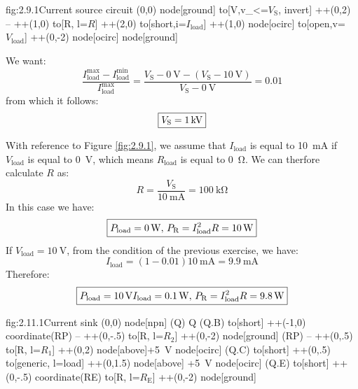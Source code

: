 \begin{circuit}{fig:2.9.1}{Current source circuit}
    (0,0) node[ground] {}
    to[V,v_<=$V_\text{S}$, invert] ++(0,2)
    -- ++(1,0)
    to[R, l=$R$] ++(2,0)
    to[short,i=$I_\text{load}$] ++(1,0)
    node[ocirc] {}
    to[open,v=$V_\text{load}$] ++(0,-2)
    node[ocirc] {}
    node[ground] {}
\end{circuit}
We want:
\[\frac{I_\text{load}^\text{max}-I_\text{load}^\text{min}}{I_\text{load}^\text{max}}=\frac{V_\text{S}-\SI{0}{\volt}-(V_\text{S}-\SI{10}{\volt})}{V_\text{S}-\SI{0}{\volt}}=0.01\]
from which it follows:
\[\boxed{V_\text{S}=\SI{1}{\kilo\volt}}\]


With reference to Figure \ref{fig:2.9.1}, we assume that $I_\text{load}$ is equal to \SI{10}{\milli\ampere} if $V_\text{load}$ is equal to \SI{0}{\volt}, which means $R_\text{load}$ is equal to \SI{0}{\ohm}. We can therfore calculate $R$ as:
\[R=\frac{V_\text{S}}{\SI{10}{\milli\ampere}}=\SI{100}{\kilo\ohm}\]
In this case we have:
\[\boxed{P_\text{load}=\SI{0}{\watt},\,P_\text{R}=I_\text{load}^2R=\SI{10}{\watt}}\]
If $V_\text{load}=\SI{10}{\volt}$, from the condition of the previous exercise, we have:
\[I_\text{load}=(1-0.01)\SI{10}{\milli\ampere}=\SI{9.9}{\milli\ampere}\]
Therefore:
\[\boxed{P_\text{load}=\SI{10}{\volt}I_\text{load}=\SI{0.1}{\watt},\,P_\text{R}=I_\text{load}^2R=\SI{9.8}{\watt}}\]

\begin{circuit}{fig:2.11.1}{Current sink}
    (0,0) node[npn] (Q) {Q}
    (Q.B) to[short] ++(-1,0) coordinate(RP)
    -- ++(0,-.5) 
    to[R, l=$R_2$] ++(0,-2)
    node[ground] {}
    (RP) -- ++(0,.5)
    to[R, l=$R_1$] ++(0,2)
    node[above]{+\SI{5}{\volt}} node[ocirc] {}
    (Q.C) to[short] ++(0,.5)
    to[generic, l=load] ++(0,1.5)
    node[above] {+\SI{5}{\volt}} node[ocirc] {}
    (Q.E) to[short] ++(0,-.5) coordinate(RE)
    to[R, l=$R_\text{E}$] ++(0,-2)
    node[ground] {}
\end{circuit}

